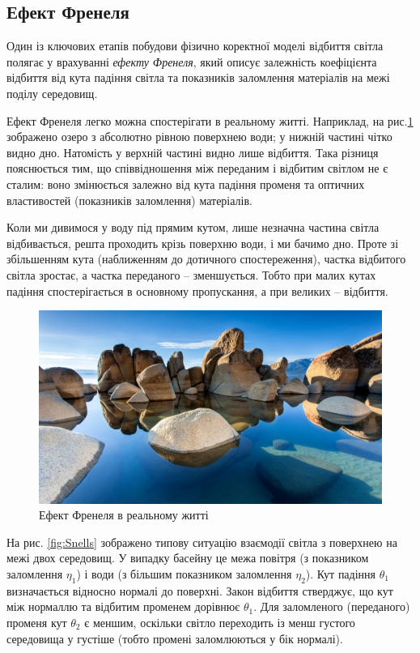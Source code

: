 \subsection{Ефект Френеля}
 \setcounter{equation}{0}
 \setcounter{theorem}{0}

Один із ключових етапів побудови фізично коректної моделі відбиття світла полягає у врахуванні \textit{ефекту Френеля}, який описує залежність коефіцієнта 
відбиття від кута падіння світла та показників заломлення матеріалів на межі поділу середовищ.

\par
Ефект Френеля легко можна спостерігати в реальному житті. Наприклад, на рис.\ref{fig:FresnelLake} зображено озеро з абсолютно рівною поверхнею води; у нижній час\-ти\-ні чітко видно дно. 
Натомість у верхній частині видно лише відбиття. Така різниця пояснюється тим, що співвідношення між переданим і відбитим світ\-лом не є сталим: воно змінюється 
залежно від кута падіння променя та оп\-тич\-них властивостей (показників заломлення) матеріалів.

Коли ми дивимося у воду під прямим кутом, лише незначна частина світла відбивається, решта проходить крізь поверхню води, і ми бачимо дно. Проте зі збільшенням кута
 (наближенням до дотичного спостереження), частка відбитого світла зростає, а частка переданого -- зменшується. Тобто при малих кутах падіння спостерігається в основному 
 пропускання, а при великих -- відбиття.

 \begin{figure}[h]
  \centering
  \includegraphics[scale=0.25]{Pictures/fresnelLake.jpg}
  \caption{Ефект Френеля в реальному житті}
  \label{fig:FresnelLake}
\end{figure}

\newpage
На рис. \ref{fig:Snells} зображено типову ситуацію взаємодії світла з поверхнею на межі двох середовищ. У випадку басейну це межа повітря 
(з показником заломлення $\eta_1$) і води (з більшим показником заломлення $\eta_2$). Кут падіння $\theta_1$ визначається відносно нормалі до поверхні. Закон 
відбиття стверджує, що кут між нормаллю та відбитим променем дорівнює $\theta_1$. Для заломленого (переданого) променя кут $\theta_2$ є меншим, оскільки світло 
переходить із менш густого середовища у густіше (тобто промені заломлюються у бік нормалі).

